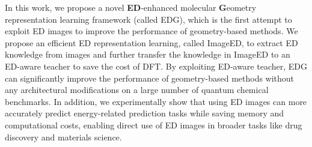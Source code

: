\documentclass{article}
\begin{document}
In this work, we propose a novel \textbf{ED}-enhanced molecular \textbf{G}eometry representation learning framework (called EDG), which is the first attempt to exploit ED images to improve the performance of geometry-based methods. We propose an efficient ED representation learning, called ImageED, to extract ED knowledge from images and further transfer the knowledge in ImageED to an ED-aware teacher to save the cost of DFT. By exploiting ED-aware teacher, EDG can significantly improve the performance of geometry-based methods without any architectural modifications on a large number of quantum chemical benchmarks. In addition, we experimentally show that using ED images can more accurately predict energy-related prediction tasks while saving memory and computational costs, enabling direct use of ED images in broader tasks like drug discovery and materials science. %
\end{document}
